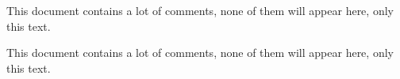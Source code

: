\documentclass{article}
\begin{document}
    This document contains a lot of comments, none of them
    will appear here, only this text.

    This document contains a lot of comments, none of them
    will appear here, only this text.

    \begin{comment}
        This text won't show up in the compiled pdf
        this is just a multi-line comment. Useful
        to, for instance, comment out slow-rendering parts
        while working on a draft.
    \end{comment}
\end{document}
